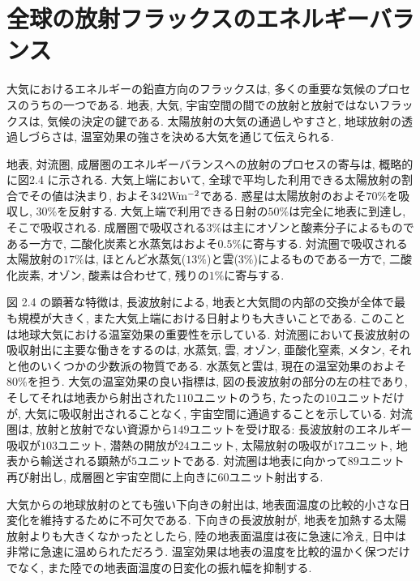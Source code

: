 \documentclass[a4j,12pt,openbib,oneside,dvipdfmx]{jbook}
\begin{document}
\newpage
{}
\section{全球の放射フラックスのエネルギーバランス}
大気におけるエネルギーの鉛直方向のフラックスは, 多くの重要な気候のプロセスのうちの一つである. 地表, 大気, 宇宙空間の間での放射と放射ではないフラックスは, 気候の決定の鍵である. 太陽放射の大気の通過しやすさと, 地球放射の透過しづらさは, 温室効果の強さを決める大気を通じて伝えられる.
\par
地表, 対流圏, 成層圏のエネルギーバランスへの放射のプロセスの寄与は, 概略的に図2.4 に示される. 大気上端において, 全球で平均した利用できる太陽放射の割合でその値は決まり, およそ$342 \rm{W}\rm{m}^{-2}$である. 
惑星は太陽放射のおよそ$70\%$を吸収し, $30\%$を反射する. 大気上端で利用できる日射の$50\%$は完全に地表に到達し, そこで吸収される. 成層圏で吸収される$3\%$は主にオゾンと酸素分子によるものである一方で, 二酸化炭素と水蒸気はおよそ$0.5\%$に寄与する. 
対流圏で吸収される太陽放射の$17\%$は, ほとんど水蒸気($13\%$)と雲($3\%$)によるものである一方で, 二酸化炭素, オゾン, 酸素は合わせて, 残りの$1\%$に寄与する. 
\par
図 2.4 の顕著な特徴は, 長波放射による, 地表と大気間の内部の交換が全体で最も規模が大きく, また大気上端における日射よりも大きいことである. 
このことは地球大気における温室効果の重要性を示している. 対流圏において長波放射の吸収射出に主要な働きをするのは, 水蒸気, 雲, オゾン, 亜酸化窒素, メタン, それと他のいくつかの少数派の物質である. 水蒸気と雲は, 現在の温室効果のおよそ$80\%$を担う. 
大気の温室効果の良い指標は, 図の長波放射の部分の左の柱であり, そしてそれは地表から射出された$110$ユニットのうち, たったの$10$ユニットだけが, 大気に吸収射出されることなく, 宇宙空間に通過することを示している. 
対流圏は, 放射と放射でない資源から$149$ユニットを受け取る: 長波放射のエネルギー吸収が$103$ユニット, 潜熱の開放が$24$ユニット, 太陽放射の吸収が$17$ユニット, 地表から輸送される顕熱が$5$ユニットである. 
対流圏は地表に向かって$89$ユニット再び射出し, 成層圏と宇宙空間に上向きに$60$ユニット射出する.
\par
大気からの地球放射のとても強い下向きの射出は, 地表面温度の比較的小さな日変化を維持するために不可欠である. 下向きの長波放射が, 地表を加熱する太陽放射よりも大きくなかったとしたら, 陸の地表面温度は夜に急速に冷え, 日中は非常に急速に温められただろう. 温室効果は地表の温度を比較的温かく保つだけでなく, また陸での地表面温度の日変化の振れ幅を抑制する.

\newpage
{}
\end{document}
